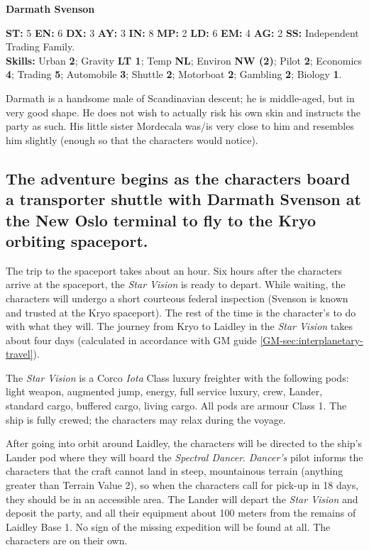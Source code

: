 \textbf{\large Darmath Svenson}

\textbf{ST:} 5 \textbf{EN:} 6 \textbf{DX:} 3 \textbf{AY:} 3 \textbf{IN:} 8 \textbf{MP:} 2 \textbf{LD:} 6 \textbf{EM:} 4 \textbf{AG:} 2 \textbf{SS:} Independent Trading Family.\\
\textbf{Skills:} Urban \textbf{2}; Gravity \textbf{LT 1}; Temp \textbf{NL}; Environ \textbf{NW (2)}; Pilot \textbf{2}; Economics \textbf{4}; Trading \textbf{5}; Automobile \textbf{3}; Shuttle \textbf{2}; Motorboat \textbf{2}; 
Gambling \textbf{2}; Biology \textbf{1}. 

Darmath is a handsome male of Scandinavian descent; he is middle-aged,
but in very good shape. He does not wish to actually risk his own skin
and instructs the party as such. His little sister Mordecala was/is
very close to him and resembles him slightly (enough so that the
characters would notice).


\subsection[Start Of Adventure]{The adventure begins as the characters
  board a transporter 
  shuttle with Darmath Svenson at the New Oslo terminal to fly to the
  Kryo orbiting spaceport.} 
\label{sec:adventure-begins-as}

The trip to the spaceport takes about an hour. Six hours after the
characters arrive at the spaceport, the \emph{Star Vision} is ready to
depart.  While waiting, the characters will undergo a short courteous
federal inspection (Svenson is known and trusted at the Kryo
spaceport).  The rest of the time is the character's to do with what
they will. The journey from Kryo to Laidley in the \emph{Star Vision}
takes about four days (calculated in accordance with GM guide
\ref{GM-sec:interplanetary-travel}).

The \emph{Star Vision} is a Corco \emph{Iota} Class luxury freighter
with the following pods: light weapon, augmented jump, energy, full
service luxury, crew, Lander, standard cargo, buffered cargo, living
cargo.  All pods are armour Class 1. The ship is fully crewed; the
characters may relax during the voyage.

After going into orbit around Laidley, the characters will be directed
to the ship's Lander pod where they will board the \emph{Spectral
  Dancer}.  \emph{Dancer's} pilot informs the characters that the
craft cannot land in steep, mountainous terrain (anything greater than
Terrain Value 2), so when the characters call for pick-up in 18 days,
they should be in an accessible area. The Lander will depart the
\emph{Star Vision} and deposit the party, and all their equipment
about 100 meters from the remains of Laidley Base 1. No sign of the
missing expedition will be found at all. The characters are on their
own.

